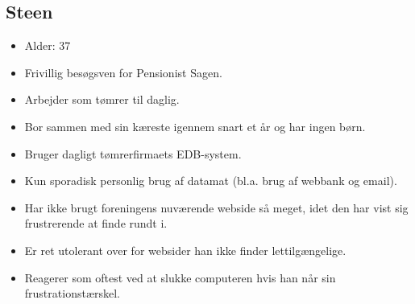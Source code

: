 \subsection{Steen}
\begin{itemize}
    \item Alder: 37
    \item Frivillig besøgsven for Pensionist Sagen.
    \item Arbejder som tømrer til daglig.
    \item Bor sammen med sin kæreste igennem snart et år og har ingen børn.
    \item Bruger dagligt tømrerfirmaets EDB-system.
    \item Kun sporadisk personlig brug af datamat (bl.a. brug af webbank og email).
    \item Har ikke brugt foreningens nuværende webside så meget, idet den har vist sig frustrerende at finde rundt i.
    \item Er ret utolerant over for websider han ikke finder lettilgængelige.
    \item Reagerer som oftest ved at slukke computeren hvis han når sin frustrationstærskel.  
\end{itemize}
